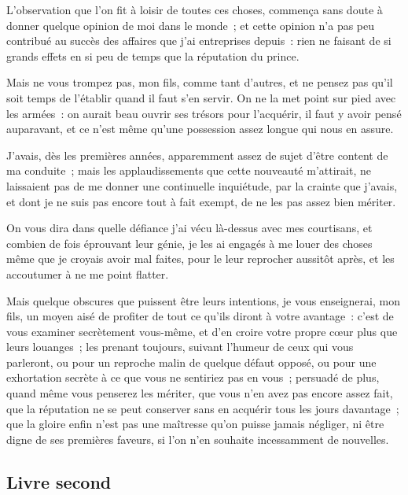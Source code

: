 \documentclass[french,twoside]{book} %
\begin{document}
L’observation que l’on fit à loisir de toutes ces choses, commença sans doute à donner quelque opinion de moi dans le monde ; et cette opinion n’a pas peu contribué au succès des affaires que j’ai entreprises depuis : rien ne faisant de si grands effets en si peu de temps que la réputation du prince.\par
Mais ne vous trompez pas, mon fils, comme tant d’autres, et ne pensez pas qu’il soit temps de l’établir quand il faut s’en servir. On ne la met point sur pied avec les armées : on aurait beau ouvrir ses trésors pour l’acquérir, il faut y avoir pensé auparavant, et ce n’est même qu’une possession assez longue qui nous en assure.\par
J’avais, dès les premières années, apparemment assez de sujet d’être content de ma conduite ; mais les applaudissements que cette nouveauté m’attirait, ne laissaient pas de me donner une continuelle inquiétude, par la crainte que j’avais, et dont je ne suis pas encore tout à fait exempt, de ne les pas assez bien mériter.\par
On vous dira dans quelle défiance j’ai vécu là-dessus avec mes courtisans, et combien de fois éprouvant leur génie, je les ai engagés à me louer des choses même que je croyais avoir mal faites, pour le leur reprocher aussitôt après, et les accoutumer à ne me point flatter.\par
Mais quelque obscures que puissent être leurs intentions, je vous enseignerai, mon fils, un moyen aisé de profiter de tout ce qu’ils diront à votre avantage : c’est de vous examiner secrètement vous-même, et d’en croire votre propre cœur plus que leurs louanges ; les prenant toujours, suivant l’humeur de ceux qui vous parleront, ou pour un reproche malin de quelque défaut opposé, ou pour une exhortation secrète à ce que vous ne sentiriez pas en vous ; persuadé de plus, quand même vous penserez les mériter, que vous n’en avez pas encore assez fait, que la réputation ne se peut conserver sans en acquérir tous les jours davantage ; que la gloire enfin n’est pas une maîtresse qu’on puisse jamais négliger, ni être digne de ses premières faveurs, si l’on n’en souhaite incessamment de nouvelles.
\subsection[{Livre second}]{Livre second}
\end{document}
